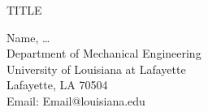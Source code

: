 \documentclass[11pt]{article}
\begin{document}
\begin{center}
{\Large TITLE}

Name, \ldots\\
Department of Mechanical Engineering\\
University of Louisiana at Lafayette\\
Lafayette, LA 70504\\
Email: Email@louisiana.edu
\end{center}
\end{document}
